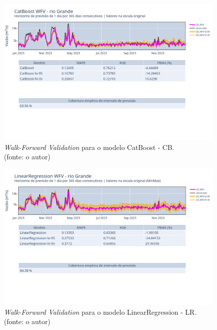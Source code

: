 \begin{figure}[!h]
	\centering
	\includegraphics[scale=0.33]{Figuras/rio_grande/wfv/CB/CB_WFV_ORIG.png}
	\caption{\textit{Walk-Forward Validation} para o modelo CatBoost - CB.\\(fonte: o autor)}
	\label{fig:grande_CB_WFV_ORIG}
\end{figure}

\begin{figure}[!h]
	\centering
	\includegraphics[scale=0.33]{Figuras/rio_grande/wfv/LR/LR_WFV_ORIG.png}
	\caption{\textit{Walk-Forward Validation} para o modelo LinearRegression - LR.\\(fonte: o autor)}
	\label{fig:grande_LR_WFV_ORIG}
\end{figure}

